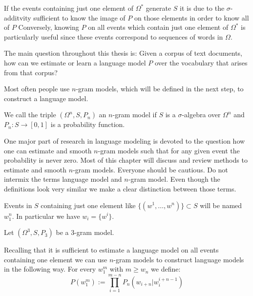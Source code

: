 \documentclass[•]{book}
\begin{document}
If the events containing just one element of $\Omega^{*}$ generate $S$ it is due to the $\sigma$-additvity sufficient to know the image of $P$ on those elements in order to know all of $P$
Conversely, knowing $P$ on all events which contain just one element of $\Omega^{*}$ is particularly useful since these events correspond to sequences of words in $\Omega$. 

The main question throughout this thesis is: 
Given a corpus of text documents, how can we estimate or learn a language model $P$ over the vocabulary that arises from that corpus? 

Most often people use $n$-gram models, which will be defined in the next step, to construct a language model.  
\begin{definition}We call the triple $(\Omega^{n}, S, P_n)$ an $n$-gram model if $S$ is a $\sigma$-algebra over $\Omega^{n}$ and $P_n:S\longrightarrow [0,1]$ is a probability function.  
\end{definition}

One major part of research in language modeling is devoted to the question how one can estimate and smooth $n$-gram models such that for any given event the probability is never zero. 
Most of this chapter will discuss and review methods to estimate and smooth $n$-gram models. 
Everyone should be cautious. 
Do not intermix the terms language model and $n$-gram model.
Even though the definitions look very similar we make a clear distinction between those terms. 

\begin{definition}
Events in  $S$ containing just one element like $\{(w^1,\dots,w^n)\}\subset S$ will be named $w_1^n$. 
In particular we have $w_i=\{w^i\}$.
\end{definition}
\begin{example}
Let $(\Omega^3,S,P_3)$ be a $3$-gram model. 
\end{example}

\begin{example}
Recalling that it is sufficient to estimate a language model on all events containing one element we can use $n$-gram models to construct language models in the following way. 
For every $w_1^m$ with $m\ge w_n$ we define:
\begin{equation}\label{eq:standardLanguageModel}
P(w_1^m):=\prod_{i=1}^{m-n}P_n(w_{i+n}|w_i^{i+n-1})
\end{equation}
\end{example}
\end{document}
